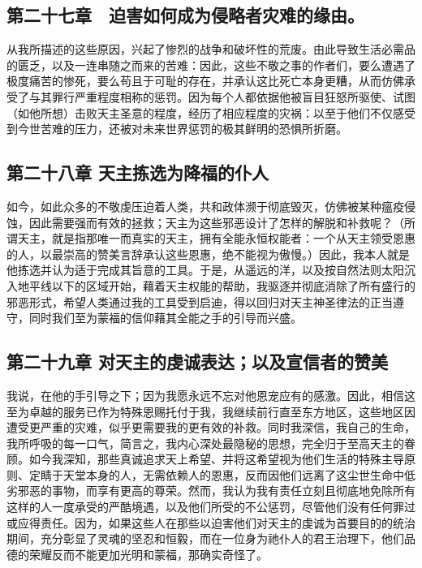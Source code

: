 
\subsection{第二十七章　迫害如何成为侵略者灾难的缘由。}

从我所描述的这些原因，兴起了惨烈的战争和破坏性的荒废。由此导致生活必需品的匮乏，以及一连串随之而来的苦难：因此，这些不敬之事的作者们，要么遭遇了极度痛苦的惨死，要么苟且于可耻的存在，并承认这比死亡本身更糟，从而仿佛承受了与其罪行严重程度相称的惩罚。因为每个人都依据他被盲目狂怒所驱使、试图（如他所想）击败天主圣意的程度，经历了相应程度的灾祸：以至于他们不仅感受到今世苦难的压力，还被对未来世界惩罚的极其鲜明的恐惧所折磨。\par


\subsection{第二十八章 天主拣选为降福的仆人}

如今，如此众多的不敬虔压迫着人类，共和政体濒于彻底毁灭，仿佛被某种瘟疫侵蚀，因此需要强而有效的拯救；天主为这些邪恶设计了怎样的解脱和补救呢？（所谓天主，就是指那唯一而真实的天主，拥有全能永恒权能者：一个从天主领受恩惠的人，以最崇高的赞美言辞承认这些恩惠，绝不能视为傲慢。）因此，我本人就是他拣选并认为适于完成其旨意的工具。于是，从遥远的洋，以及按自然法则太阳沉入地平线以下的区域开始，藉着天主权能的帮助，我驱逐并彻底消除了所有盛行的邪恶形式，希望人类通过我的工具受到启迪，得以回归对天主神圣律法的正当遵守，同时我们至为蒙福的信仰藉其全能之手的引导而兴盛。\par


\subsection{第二十九章 对天主的虔诚表达；以及宣信者的赞美}

我说，在他的手引导之下；因为我愿永远不忘对他恩宠应有的感激。因此，相信这至为卓越的服务已作为特殊恩赐托付于我，我继续前行直至东方地区，这些地区因遭受更严重的灾难，似乎更需要我的更有效的补救。同时我深信，我自己的生命，我所呼吸的每一口气，简言之，我内心深处最隐秘的思想，完全归于至高天主的眷顾。如今我深知，那些真诚追求天上希望、并将这希望视为他们生活的特殊主导原则、定睛于天堂本身的人，无需依赖人的恩惠，反而因他们远离了这尘世生命中低劣邪恶的事物，而享有更高的尊荣。然而，我认为我有责任立刻且彻底地免除所有这样的人一度承受的严酷境遇，以及他们所受的不公惩罚，尽管他们没有任何罪过或应得责任。因为，如果这些人在那些以迫害他们对天主的虔诚为首要目的的统治期间，充分彰显了灵魂的坚忍和恒毅，而在一位身为祂仆人的君王治理下，他们品德的荣耀反而不能更加光明和蒙福，那确实奇怪了。\par


